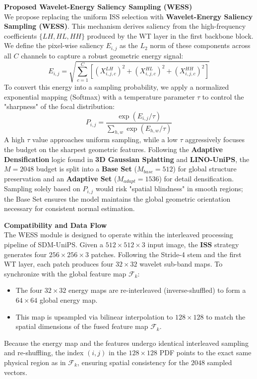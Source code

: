 \documentclass[Main.tex]{subfiles}
\begin{document}
\textbf{Proposed Wavelet-Energy Saliency Sampling (WESS)} \\
We propose replacing the uniform ISS selection with \textbf{Wavelet-Energy Saliency Sampling (WESS)}. This mechanism derives saliency from the high-frequency coefficients $\{LH, HL, HH\}$ produced by the WT layer in the first backbone block. We define the pixel-wise saliency $E_{i,j}$ as the $L_2$ norm of these components across all $C$ channels to capture a robust geometric energy signal:
\begin{equation}
    E_{i,j} = \sqrt{\sum_{c=1}^{C} \left[ \left(X^{LH}_{i,j,c}\right)^2 + \left(X^{HL}_{i,j,c}\right)^2 + \left(X^{HH}_{i,j,c}\right)^2 \right]}
\end{equation}
To convert this energy into a sampling probability, we apply a normalized exponential mapping (Softmax) with a temperature parameter $\tau$ to control the "sharpness" of the focal distribution:
\begin{equation}
    P_{i,j} = \frac{\exp(E_{i,j} / \tau)}{\sum_{h,w} \exp(E_{h,w} / \tau)}
\end{equation}
A high $\tau$ value approaches uniform sampling, while a low $\tau$ aggressively focuses the budget on the sharpest geometric features. Following the \textbf{Adaptive Densification} logic found in \textbf{3D Gaussian Splatting} and \textbf{LINO-UniPS}, the $M=2048$ budget is split into a \textbf{Base Set} ($M_{base}=512$) for global structure preservation and an \textbf{Adaptive Set} ($M_{adapt}=1536$) for detail densification. Sampling solely based on $P_{i,j}$ would risk "spatial blindness" in smooth regions; the Base Set ensures the model maintains the global geometric orientation necessary for consistent normal estimation.

\textbf{Compatibility and Data Flow} \\
The WESS module is designed to operate within the interleaved processing pipeline of SDM-UniPS. Given a \textbf{$512 \times 512 \times 3$} input image, the \textbf{ISS} strategy generates four \textbf{$256 \times 256 \times 3$} patches. Following the Stride-4 stem and the first WT layer, each patch produces four \textbf{$32 \times 32$} wavelet sub-band maps. To synchronize with the global feature map $\mathcal{F}_k$:
\begin{itemize}
    \item The four $32 \times 32$ energy maps are re-interleaved (inverse-shuffled) to form a \textbf{$64 \times 64$} global energy map.
    \item This map is upsampled via bilinear interpolation to \textbf{$128 \times 128$} to match the spatial dimensions of the fused feature map $\mathcal{F}_k$.
\end{itemize}
Because the energy map and the features undergo identical interleaved sampling and re-shuffling, the index $(i, j)$ in the $128 \times 128$ PDF points to the exact same physical region as in $\mathcal{F}_k$, ensuring spatial consistency for the $2048$ sampled vectors.
\end{document}
